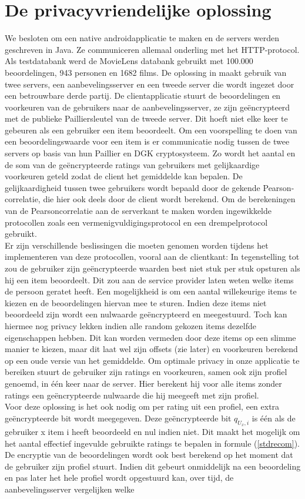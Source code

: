 \documentclass[twocolumn]{phdsymp} %
\begin{document}
\section{De privacyvriendelijke oplossing}
We besloten om een native androidapplicatie te maken en de servers werden geschreven in Java. Ze communiceren allemaal onderling met het HTTP-protocol. Als testdatabank werd de MovieLens databank gebruikt met 100.000 beoordelingen, 943 personen en 1682 films. De oplossing in \cite{dyn} maakt gebruik van twee servers, een aanbevelingsserver en een tweede server die wordt ingezet door een betrouwbare derde partij. De clientapplicatie stuurt de beoordelingen en voorkeuren van de gebruikers naar de aanbevelingsserver, ze zijn ge\"encrypteerd met de publieke Pailliersleutel van de tweede server. Dit hoeft niet elke keer te gebeuren als een gebruiker een item beoordeelt. Om een voorspelling te doen van een beoordelingswaarde voor een item is er communicatie nodig tussen de twee servers op basis van hun Paillier en DGK cryptosysteem. Zo wordt het aantal en de som van de ge\"encrypteerde ratings van gebruikers met gelijkaardige voorkeuren geteld zodat de client het gemiddelde kan bepalen. De gelijkaardigheid tussen twee gebruikers wordt bepaald door de gekende Pearson-correlatie, die hier ook deels door de client wordt berekend. Om de berekeningen van de Pearsoncorrelatie aan de serverkant te maken worden ingewikkelde protocollen zoals een vermenigvuldigingsprotocol en een drempelprotocol gebruikt. \\Er zijn verschillende beslissingen die moeten genomen worden tijdens het implementeren van deze protocollen, vooral aan de clientkant: In tegenstelling tot \cite{dyn} zou de gebruiker zijn ge\"encrypteerde waarden best niet stuk per stuk opsturen als hij een item beoordeelt. Dit zou aan de service provider laten weten welke items de persoon geratet heeft. Een mogelijkheid is om een aantal willekeurige items te kiezen en de beoordelingen hiervan mee te sturen. Indien deze items niet beoordeeld zijn wordt een nulwaarde ge\"encrypteerd en meegestuurd. Toch kan hiermee nog privacy lekken indien alle random gekozen items dezelfde eigenschappen hebben. Dit kan worden vermeden door deze items op een slimme manier te kiezen, maar dit laat wel zijn offsets (zie later) en voorkeuren berekend op een oude versie van het gemiddelde. Om optimale privacy in onze applicatie te bereiken stuurt de gebruiker zijn ratings en voorkeuren, samen ook zijn profiel genoemd, in \'e\'en  keer naar de server. Hier berekent hij voor alle items zonder ratings een ge\"encrypteerde nulwaarde die hij meegeeft met zijn profiel.\\ Voor deze oplossing is het ook nodig om per rating uit een profiel, een extra ge\"encrypteerde bit wordt meegegeven. Deze ge\"encrypteerde bit $ q_{U_x,i} $ is één als de gebruiker x item i heeft beoordeeld en nul indien niet. Dit maakt het mogelijk om het aantal effectief ingevulde gebruikte ratings te bepalen in formule (\ref{stdrecom}). De encryptie van de beoordelingen wordt ook best berekend op het moment dat de gebruiker zijn profiel stuurt. Indien dit gebeurt onmiddelijk na een beoordeling en pas later het hele profiel wordt opgestuurd kan, over tijd, de aanbevelingsserver vergelijken welke 
\end{document}
